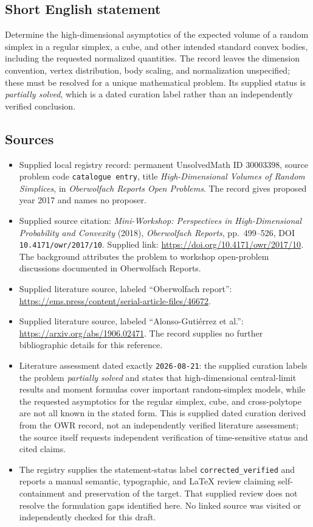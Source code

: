 \documentclass[11pt]{article}
\begin{document}
\subsection{Short English statement}
Determine the high-dimensional asymptotics of the expected volume of a random simplex in a regular simplex, a cube, and other intended standard convex bodies, including the requested normalized quantities. The record leaves the dimension convention, vertex distribution, body scaling, and normalization unspecified; these must be resolved for a unique mathematical problem. Its supplied status is \emph{partially solved}, which is a dated curation label rather than an independently verified conclusion.
\subsection{Sources}
\begin{itemize}
\item Supplied local registry record: permanent UnsolvedMath ID \(30003398\), source problem code \texttt{catalogue entry}, title \emph{High-Dimensional Volumes of Random Simplices}, in \emph{Oberwolfach Reports Open Problems}. The record gives proposed year 2017 and names no proposer.
\item Supplied source citation: \emph{Mini-Workshop: Perspectives in High-Dimensional Probability and Convexity} (2018), \emph{Oberwolfach Reports}, pp.\ 499--526, DOI \texttt{10.4171/owr/2017/10}. Supplied link: \url{https://doi.org/10.4171/owr/2017/10}. The background attributes the problem to workshop open-problem discussions documented in Oberwolfach Reports.
\item Supplied literature source, labeled ``Oberwolfach report'': \url{https://ems.press/content/serial-article-files/46672}.
\item Supplied literature source, labeled ``Alonso-Gutiérrez et al.'': \url{https://arxiv.org/abs/1906.02471}. The record supplies no further bibliographic details for this reference.
\item Literature assessment dated exactly \texttt{2026-08-21}: the supplied curation labels the problem \emph{partially solved} and states that high-dimensional central-limit results and moment formulas cover important random-simplex models, while the requested asymptotics for the regular simplex, cube, and cross-polytope are not all known in the stated form. This is supplied dated curation derived from the OWR record, not an independently verified literature assessment; the source itself requests independent verification of time-sensitive status and cited claims.
\item The registry supplies the statement-status label \texttt{corrected\_verified} and reports a manual semantic, typographic, and LaTeX review claiming self-containment and preservation of the target. That supplied review does not resolve the formulation gaps identified here. No linked source was visited or independently checked for this draft.
\end{itemize}
\end{document}
